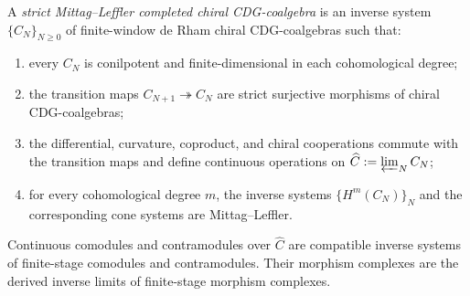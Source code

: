 \begin{definition}
\label{def:strict-ml-completed-chiral-coalgebra}
A \emph{strict Mittag--Leffler completed chiral CDG-coalgebra} is an
inverse system $\{C_N\}_{N\geq0}$ of finite-window de Rham chiral
CDG-coalgebras such that:
\begin{enumerate}[label=\textup{(ML\arabic*)}]
\item every $C_N$ is conilpotent and finite-dimensional in each
cohomological degree;
\item the transition maps $C_{N+1}\twoheadrightarrow C_N$ are strict
surjective morphisms of chiral CDG-coalgebras;
\item the differential, curvature, coproduct, and chiral cooperations
commute with the transition maps and define continuous operations on
$\widehat C:=\varprojlim_N C_N$;
\item for every cohomological degree $m$, the inverse systems
$\{H^m(C_N)\}_N$ and the corresponding cone systems are
Mittag--Leffler.
\end{enumerate}
Continuous comodules and contramodules over $\widehat C$ are compatible
inverse systems of finite-stage comodules and contramodules. Their
morphism complexes are the derived inverse limits of finite-stage
morphism complexes.
\end{definition}

